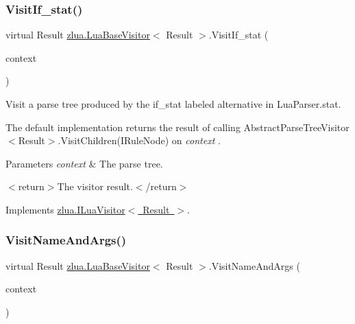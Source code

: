 \subsubsection{\texorpdfstring{Visit\+If\+\_\+stat()}{VisitIf\_stat()}}
{\footnotesize\ttfamily virtual Result \mbox{\hyperlink{classzlua_1_1_lua_base_visitor}{zlua.\+Lua\+Base\+Visitor}}$<$ Result $>$.Visit\+If\+\_\+stat (\begin{DoxyParamCaption}\item[{\mbox{[}\+Not\+Null\mbox{]} \mbox{\hyperlink{classzlua_1_1_lua_parser_1_1_if__stat_context}{Lua\+Parser.\+If\+\_\+stat\+Context}}}]{context }\end{DoxyParamCaption})\hspace{0.3cm}{\ttfamily [virtual]}}



Visit a parse tree produced by the {\ttfamily if\+\_\+stat} labeled alternative in Lua\+Parser.\+stat. 

The default implementation returns the result of calling Abstract\+Parse\+Tree\+Visitor$<$\+Result$>$.\+Visit\+Children(\+I\+Rule\+Node) on {\itshape context} . 


\begin{DoxyParams}{Parameters}
{\em context} & The parse tree.\\
\hline
\end{DoxyParams}
$<$return$>$The visitor result.$<$/return$>$ 

Implements \mbox{\hyperlink{interfacezlua_1_1_i_lua_visitor_a67ff0fb78fe2f6c915b5f218f57323b3}{zlua.\+I\+Lua\+Visitor$<$ Result $>$}}.

\mbox{\label{classzlua_1_1_lua_base_visitor_a461a0315ce3a25873432dd1e9153bcc6}} 
\subsubsection{\texorpdfstring{Visit\+Name\+And\+Args()}{VisitNameAndArgs()}}
{\footnotesize\ttfamily virtual Result \mbox{\hyperlink{classzlua_1_1_lua_base_visitor}{zlua.\+Lua\+Base\+Visitor}}$<$ Result $>$.Visit\+Name\+And\+Args (\begin{DoxyParamCaption}\item[{\mbox{[}\+Not\+Null\mbox{]} \mbox{\hyperlink{classzlua_1_1_lua_parser_1_1_name_and_args_context}{Lua\+Parser.\+Name\+And\+Args\+Context}}}]{context }\end{DoxyParamCaption})\hspace{0.3cm}{\ttfamily [virtual]}}



